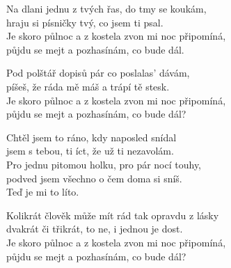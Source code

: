 
\ve{}
Na dlani jednu z tvých řas, do tmy se koukám,\\
hraju si písničky tvý, co jsem ti psal.\\
Je skoro půlnoc a z kostela zvon mi noc připomíná,\\
půjdu se mejt a pozhasínám, co bude dál. 

\ve{}
Pod polštář dopisů pár co poslalas' dávám,\\
píšeš, že ráda mě máš a trápí tě stesk.\\
Je skoro půlnoc a z kostela zvon mi noc připomíná,\\ 
půjdu se mejt a pozhasínám, co bude dál?

\cho{}
Chtěl jsem to ráno, kdy naposled snídal\\
jsem s tebou, ti íct, že už ti nezavolám.\\
Pro jednu pitomou holku, pro pár nocí touhy,\\
podved jsem všechno o čem doma si sníš.\\
Teď je mi to líto. 

\ve{}
Kolikrát člověk může mít rád tak opravdu z lásky\\
dvakrát či třikrát, to ne, i jednou je dost.\\
Je skoro půlnoc a z kostela zvon mi noc připomíná,\\
půjdu se mejt a pozhasínám, co bude dál?

\cho{}

\re{}

\esong{}